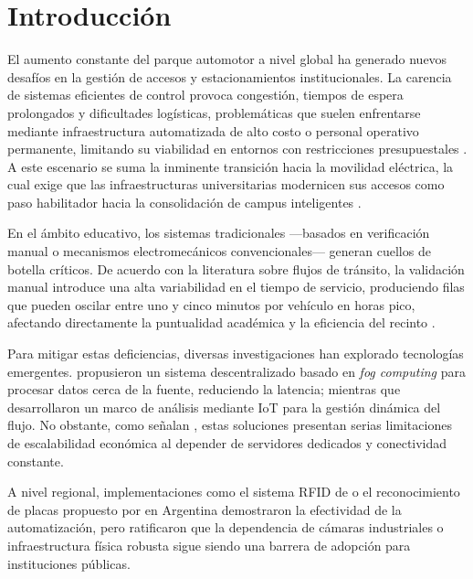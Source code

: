 \documentclass[12pt, letterpaper]{article}
\begin{document}
\newpage

\newpage
\tableofcontents %
\newpage
\listoffigures %
\newpage
\listoftables %
\newpage

\section{Introducción}

El aumento constante del parque automotor a nivel global ha generado nuevos desafíos en la gestión de accesos y estacionamientos institucionales. La carencia de sistemas eficientes de control provoca congestión, tiempos de espera prolongados y dificultades logísticas, problemáticas que suelen enfrentarse mediante infraestructura automatizada de alto costo o personal operativo permanente, limitando su viabilidad en entornos con restricciones presupuestales \parencite{alam2023survey}. A este escenario se suma la inminente transición hacia la movilidad eléctrica, la cual exige que las infraestructuras universitarias modernicen sus accesos como paso habilitador hacia la consolidación de campus inteligentes \parencite{leurent2011mobility, efthymiou2017ev, subash2025ev}.

En el ámbito educativo, los sistemas tradicionales —basados en verificación manual o mecanismos electromecánicos convencionales— generan cuellos de botella críticos. De acuerdo con la literatura sobre flujos de tránsito, la validación manual introduce una alta variabilidad en el tiempo de servicio, produciendo filas que pueden oscilar entre uno y cinco minutos por vehículo en horas pico, afectando directamente la puntualidad académica y la eficiencia del recinto \parencite{fhwa_traffic_2017}.

Para mitigar estas deficiencias, diversas investigaciones han explorado tecnologías emergentes. \textcite{celaya2020fog} propusieron un sistema descentralizado basado en \textit{fog computing} para procesar datos cerca de la fuente, reduciendo la latencia; mientras que \textcite{marshoodulla2024sdiotpark} desarrollaron un marco de análisis mediante IoT para la gestión dinámica del flujo. No obstante, como señalan \textcite{alam2023survey}, estas soluciones presentan serias limitaciones de escalabilidad económica al depender de servidores dedicados y conectividad constante.

A nivel regional, implementaciones como el sistema RFID de \textcite{olivares2011rfid} o el reconocimiento de placas propuesto por \textcite{valeo2020patentes} en Argentina demostraron la efectividad de la automatización, pero ratificaron que la dependencia de cámaras industriales o infraestructura física robusta sigue siendo una barrera de adopción para instituciones públicas. 
\end{document}
